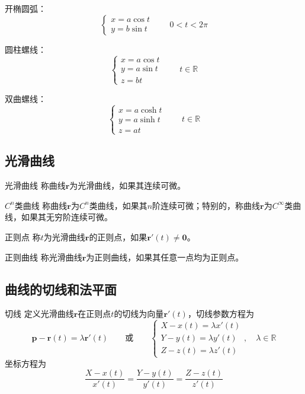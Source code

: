 \documentclass[lang = cn, scheme = chinese, thmcnt = section]{elegantbook}
\newcommand{\R}{\mathbb{R}}            %
\newcommand{\bs}{\boldsymbol}          %
\begin{document}
\begin{example}
	开椭圆弧：
	$$
	\begin{cases}
		x=a\cos t\\
		y=b\sin t
	\end{cases}\qquad 
	0<t<2\pi
	$$
\end{example}

\begin{example}
	圆柱螺线：
	$$
	\begin{cases}
		x=a\cos t\\
		y=a\sin t\\
		z=bt
	\end{cases}\qquad 
	t\in\R
	$$
\end{example}

\begin{example}
	双曲螺线：
	$$
	\begin{cases}
		x=a\cosh t\\
		y=a\sinh t\\
		z=at
	\end{cases}\qquad 
	t\in\R
	$$
\end{example}

\subsection{光滑曲线}

\begin{definition}{光滑曲线}
	称曲线$\bs{r}$为光滑曲线，如果其连续可微。
\end{definition}

\begin{definition}{$C^n$类曲线}
	称曲线$\bs{r}$为$C^n$类曲线，如果其$n$阶连续可微；特别的，称曲线$\bs{r}$为$C^\infty$类曲线，如果其无穷阶连续可微。
\end{definition}

\begin{definition}{正则点}
	称$t$为光滑曲线$\bs{r}$的正则点，如果$\bs{r}'(t)\ne\bs{0}$。
\end{definition}

\begin{definition}{正则曲线}
	称光滑曲线$\bs{r}$为正则曲线，如果其任意一点均为正则点。
\end{definition}

\subsection{曲线的切线和法平面}

\begin{definition}{切线}
	定义光滑曲线$\bs{r}$在正则点$t$的切线为向量$\bs{r}'(t)$，切线参数方程为
	$$
	\bs{p}-\bs{r}(t)=\lambda\bs{r}'(t)\qquad 
	\text{或}\qquad
	\begin{cases}
		X-x(t)=\lambda x'(t)\\
		Y-y(t)=\lambda y'(t)\\
		Z-z(t)=\lambda z'(t)
	\end{cases},\quad \lambda\in\R
	$$
	坐标方程为
	$$
	\frac{X-x(t)}{x'(t)}
	=\frac{Y-y(t)}{y'(t)}
	=\frac{Z-z(t)}{z'(t)}
	$$
\end{definition}
\end{document}
